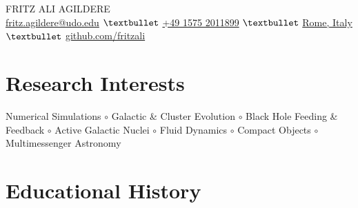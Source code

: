 \documentclass[11pt,a4paper]{article}
\begin{document}

\begin{center}
	{\customfont\huge\color{accenttext}FRIT{\kern0.5pt}Z ALI AGILDERE} \\
	\vspace{7pt}
	\small
	\href{mailto:fritz.agildere@udo.edu}{fritz.agildere@udo.edu} {\normalsize$\textbullet$}
	\href{tel:+4915752011899}{+49 1575 2011899} {\normalsize$\textbullet$}
	\href{https://www.openstreetmap.org/search?query=rome,italy}{Rome, Italy} {\normalsize$\textbullet$}
	\href{https://github.com/fritzali}{github.com/fritzali}
\end{center}

\section{Research Interests}
\noindent Numerical Simulations $\circ$ Galactic \& Cluster Evolution
$\circ$ Black Hole Feeding \& Feedback $\circ$ Active Galactic Nuclei
$\circ$ Fluid Dynamics $\circ$ Compact Objects $\circ$ Multimessenger Astronomy


\section{Educational History}
\end{document}
